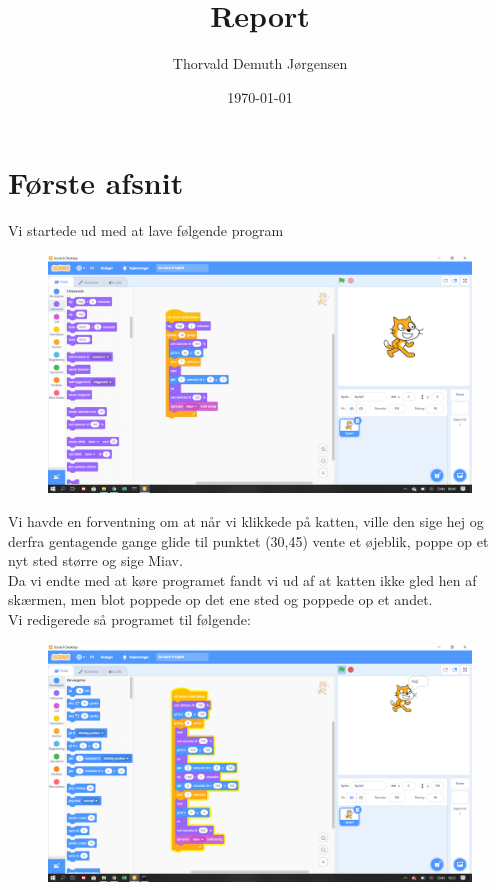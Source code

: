 \documentclass{article}
\title{Report}
\author{Thorvald Demuth Jørgensen}
\date{\today}
\begin{document}
\maketitle 


\section{Første afsnit} 
Vi startede ud med at lave følgende program \\

\begin{figure}[h]
	\includegraphics[width=\linewidth]{1billede.png}
\end{figure}

Vi havde en forventning om at når vi klikkede på katten, ville den sige hej og derfra gentagende gange glide til punktet (30,45) vente et øjeblik, poppe op et nyt sted større og sige Miav. \\
Da vi endte med at køre programet fandt vi ud af at katten ikke gled hen af skærmen, men blot poppede op det ene sted og poppede op et andet. \\
Vi redigerede så programet til følgende: \\

\begin{figure}[h]
	\includegraphics[width=\linewidth]{2billede.png}
\end{figure}
\end{document}

